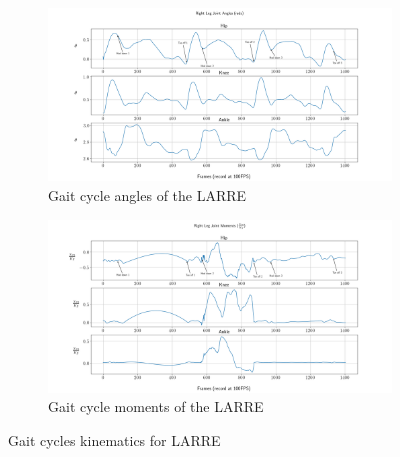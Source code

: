 \begin{figure}
    \begin{subfigure}{\textwidth}
        \centering
        \captionsetup{justification=centering}
        \centerline{
        \includegraphics[width=\textwidth, frame]{images/mech_design/exo_joint_angles.png}}
        \caption[LARRE gait cycle angles]{Gait cycle angles of the LARRE}
        \label{fig:larregaitangles}
    \end{subfigure}
    \begin{subfigure}{\textwidth}
        \centering
        \captionsetup{justification=centering}
        \centerline{
        \includegraphics[width=\textwidth, frame]{images/mech_design/exo_joint_moments.png}}
        \caption[LARRE gait cycle moments]{Gait cycle moments of the LARRE}
        \label{fig:larregaitmoments}
    \end{subfigure}    
    \caption{Gait cycles kinematics for LARRE}
    \label{fig:exojointkin}
\end{figure}






